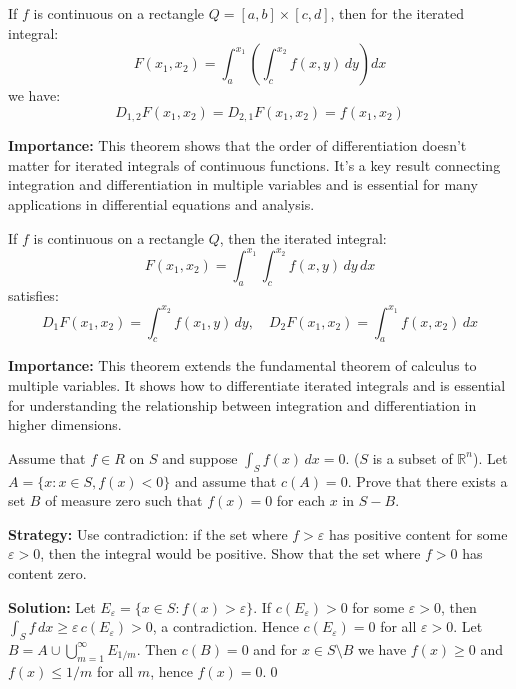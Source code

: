 \begin{theorem}
If $f$ is continuous on a rectangle $Q = [a, b] \times [c, d]$, then for the iterated integral:
\[F(x_1, x_2) = \int_a^{x_1} \left(\int_c^{x_2} f(x, y) \, dy\right) dx\]
we have:
\[D_{1,2} F(x_1, x_2) = D_{2,1} F(x_1, x_2) = f(x_1, x_2)\]
\end{theorem}

\noindent\textbf{Importance:} This theorem shows that the order of differentiation doesn't matter for iterated integrals of continuous functions. It's a key result connecting integration and differentiation in multiple variables and is essential for many applications in differential equations and analysis.



\begin{theorem}
If $f$ is continuous on a rectangle $Q$, then the iterated integral:
\[F(x_1, x_2) = \int_a^{x_1} \int_c^{x_2} f(x, y) \, dy \, dx\]
satisfies:
\[D_1 F(x_1, x_2) = \int_c^{x_2} f(x_1, y) \, dy, \quad D_2 F(x_1, x_2) = \int_a^{x_1} f(x, x_2) \, dx\]
\end{theorem}

\noindent\textbf{Importance:} This theorem extends the fundamental theorem of calculus to multiple variables. It shows how to differentiate iterated integrals and is essential for understanding the relationship between integration and differentiation in higher dimensions.





\begin{problembox}
\begin{problemstatement}
Assume that \( f \in R \) on \( S \) and suppose \( \int_S f(x) \, dx = 0 \). (\( S \) is a subset of \( \mathbb{R}^n \)). Let \( A = \{ x : x \in S, f(x) < 0 \} \) and assume that \( c(A) = 0 \). Prove that there exists a set \( B \) of measure zero such that \( f(x) = 0 \) for each \( x \) in \( S - B \).
\end{problemstatement}
\end{problembox}

\noindent\textbf{Strategy:} Use contradiction: if the set where $f>\varepsilon$ has positive content for some $\varepsilon>0$, then the integral would be positive. Show that the set where $f>0$ has content zero.

\bigskip\noindent\textbf{Solution:}
Let $E_\varepsilon=\{x\in S:f(x)>\varepsilon\}$. If $c(E_\varepsilon)>0$ for some $\varepsilon>0$, then $\int_S f\,dx\ge \varepsilon\,c(E_\varepsilon)>0$, a contradiction. Hence $c(E_\varepsilon)=0$ for all $\varepsilon>0$. Let $B=A\cup\bigcup_{m=1}^\infty E_{1/m}$. Then $c(B)=0$ and for $x\in S\setminus B$ we have $f(x)\ge 0$ and $f(x)\le 1/m$ for all $m$, hence $f(x)=0$.\qed


